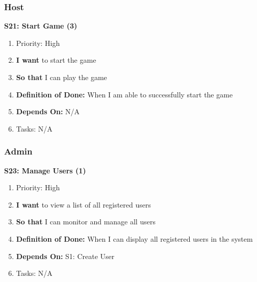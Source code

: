 \subsubsection{Host}

\textbf{S21: Start Game (3)}
\begin{enumerate}
    \item Priority: High
    \item \textbf{I want} to start the game
    \item \textbf{So that} I can play the game
    \item \textbf{Definition of Done:} When I am able to successfully start the game
    \item \textbf{Depends On:} N/A
    \item Tasks: N/A
\end{enumerate}


\subsubsection{Admin}

\textbf{S23: Manage Users (1)}
\begin{enumerate}
    \item Priority: High
    \item \textbf{I want} to view a list of all registered users
    \item \textbf{So that} I can monitor and manage all users
    \item \textbf{Definition of Done:} When I can display all registered users in the system
    \item \textbf{Depends On:} S1: Create User
    \item Tasks: N/A
\end{enumerate}


